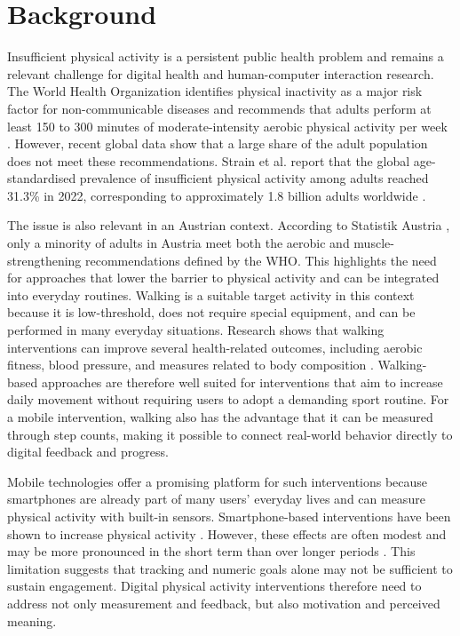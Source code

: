 \section{Background}

Insufficient physical activity is a persistent public health problem and remains a relevant challenge for digital health and human-computer interaction research. The World Health Organization identifies physical inactivity as a major risk factor for non-communicable diseases and recommends that adults perform at least 150 to 300 minutes of moderate-intensity aerobic physical activity per week \cite{Bull2020WHOActivityGuidelines,WHO2024PhysicalActivity}. However, recent global data show that a large share of the adult population does not meet these recommendations. Strain et al. \cite{Strain2024InactivityTrends} report that the global age-standardised prevalence of insufficient physical activity among adults reached 31.3\% in 2022, corresponding to approximately 1.8 billion adults worldwide \cite{Strain2024InactivityTrends}.

The issue is also relevant in an Austrian context. According to Statistik Austria \cite{StatistikAustria2025PhysicalActivity}, only a minority of adults in Austria meet both the aerobic and muscle-strengthening recommendations defined by the WHO. This highlights the need for approaches that lower the barrier to physical activity and can be integrated into everyday routines. Walking is a suitable target activity in this context because it is low-threshold, does not require special equipment, and can be performed in many everyday situations. Research shows that walking interventions can improve several health-related outcomes, including aerobic fitness, blood pressure, and measures related to body composition \cite{Murtagh2015WalkingCVD}. Walking-based approaches are therefore well suited for interventions that aim to increase daily movement without requiring users to adopt a demanding sport routine. For a mobile intervention, walking also has the advantage that it can be measured through step counts, making it possible to connect real-world behavior directly to digital feedback and progress.

Mobile technologies offer a promising platform for such interventions because smartphones are already part of many users' everyday lives and can measure physical activity with built-in sensors. Smartphone-based interventions have been shown to increase physical activity \cite{Laranjo2021AppsTrackers}. However, these effects are often modest and may be more pronounced in the short term than over longer periods \cite{Romeo2019SmartphoneAppsPA}. This limitation suggests that tracking and numeric goals alone may not be sufficient to sustain engagement. Digital physical activity interventions therefore need to address not only measurement and feedback, but also motivation and perceived meaning.

